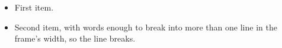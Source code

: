 \documentclass{beamer}
\begin{document}
\begin{frame}
\begin{itemize}
\item First item.
\item Second item, with words enough to break into more than one line in the frame's width, so the line breaks.
\end{itemize}
\end{frame}
\end{document}
